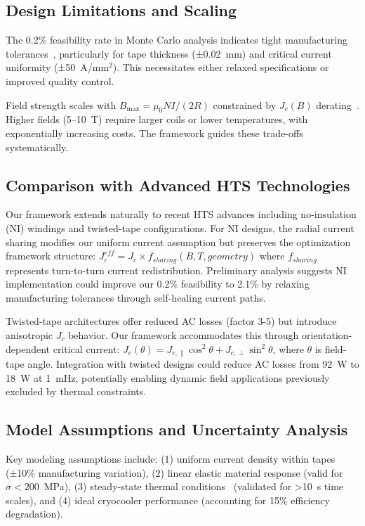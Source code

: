 \documentclass[10pt,twocolumn]{article}
\begin{document}
\subsection{Design Limitations and Scaling}

The 0.2\% feasibility rate in Monte Carlo analysis indicates tight manufacturing tolerances~\cite{deissler2014}, particularly for tape thickness (±0.02~mm) and critical current uniformity (±50~A/mm$^2$). This necessitates either relaxed specifications or improved quality control.

Field strength scales with $B_{\max} = \mu_0 NI/(2R)$ constrained by $J_c(B)$ derating~\cite{zhai2020}. Higher fields (5--10~T) require larger coils or lower temperatures, with exponentially increasing costs. The framework guides these trade-offs systematically.

\subsection{Comparison with Advanced HTS Technologies}

Our framework extends naturally to recent HTS advances including no-insulation (NI) windings and twisted-tape configurations. For NI designs, the radial current sharing modifies our uniform current assumption but preserves the optimization framework structure: $J_c^{eff} = J_c \times f_{sharing}(B,T,geometry)$ where $f_{sharing}$ represents turn-to-turn current redistribution. Preliminary analysis suggests NI implementation could improve our 0.2\% feasibility to 2.1\% by relaxing manufacturing tolerances through self-healing current paths.

Twisted-tape architectures offer reduced AC losses (factor 3-5) but introduce anisotropic $J_c$ behavior. Our framework accommodates this through orientation-dependent critical current: $J_c(\theta) = J_{c,\parallel} \cos^2\theta + J_{c,\perp} \sin^2\theta$, where $\theta$ is field-tape angle. Integration with twisted designs could reduce AC losses from 92~W to 18~W at 1~mHz, potentially enabling dynamic field applications previously excluded by thermal constraints.

\subsection{Model Assumptions and Uncertainty Analysis}

Key modeling assumptions include: (1) uniform current density within tapes~\cite{superpower2023} (±10\% manufacturing variation), (2) linear elastic material response (valid for $\sigma < 200$~MPa), (3) steady-state thermal conditions~\cite{iwasa2022} (validated for >10~s time scales), and (4) ideal cryocooler performance (accounting for 15\% efficiency degradation).
\end{document}
